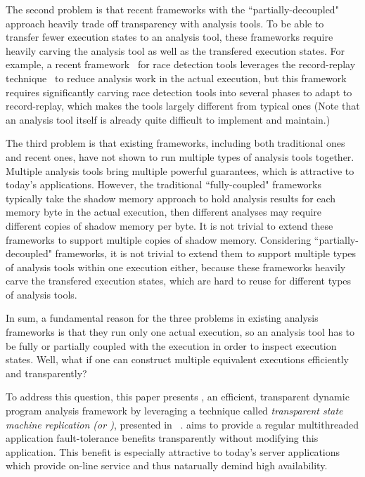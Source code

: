 The second problem is that recent frameworks with the ``partially-decoupled"
approach heavily trade off transparency with analysis tools. To be able to
transfer fewer execution states to an analysis tool, these frameworks require
heavily carving the analysis tool as well as the transfered execution states.
For example, a recent framework~\cite{wester:parallelizing:asplos13} for race
detection tools leverages the record-replay
technique~\cite{scribe:sigmetrics2010, respec:asplos10, racepro:sosp11} to
reduce analysis work in the actual execution, but this framework
requires significantly carving race detection tools into several phases to adapt
to record-replay, which makes the tools largely different from typical ones
(Note that an analysis tool itself is already quite difficult to implement and
maintain.)


The third problem is that existing frameworks, including both traditional ones
and recent ones, have not shown to run multiple types of analysis tools 
together. Multiple analysis tools bring multiple powerful
guarantees, which is attractive to today's applications. However, the
traditional ``fully-coupled" frameworks typically take the shadow memory 
approach to hold analysis results for each memory byte in the actual execution, 
then different analyses may require different copies of shadow memory per byte. 
It is not trivial to extend these frameworks to support multiple copies of 
shadow memory. Considering ``partially-decoupled" frameworks, it is not trivial 
to extend them to support multiple types of analysis tools within one execution 
either, because these frameworks heavily carve the transfered execution states, 
which are hard to reuse for different types of analysis tools.


In sum, a fundamental reason for the three problems in existing analysis 
frameworks is that they run only one actual execution, so an analysis tool has
to be fully or partially coupled with the execution in order to inspect
execution states. Well, what if one can construct multiple equivalent
executions efficiently and transparently?




To address this question, this paper presents \xxx, an efficient, 
transparent dynamic program analysis framework by leveraging a technique called 
\emph{transparent state machine replication (or \tsmr)}, presented in 
\repbox~\cite{repbox:sosp15}. \tsmr aims to provide a regular 
multithreaded application fault-tolerance benefits transparently without modifying 
this application. This benefit is especially attractive to today's server applications which 
provide on-line service and thus natarually demind high availability.


